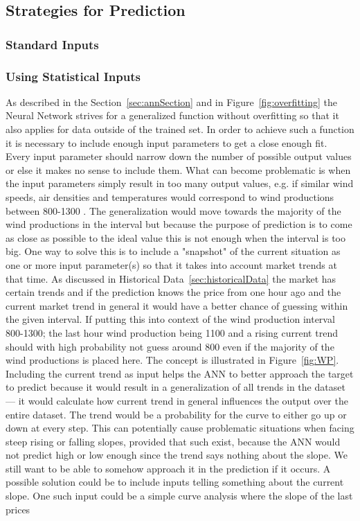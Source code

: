 \subsection{Strategies for Prediction}
\subsubsection{Standard Inputs}

\subsubsection{Using Statistical Inputs}
\label{sec:usingStatisticalInput}
As described in the Section~\ref{sec:annSection} and in Figure~\ref{fig:overfitting} the Neural Network strives for a generalized function without overfitting so that it also applies for data outside of the trained set. In order to achieve such a function it is necessary to include enough input parameters to get a close enough fit. Every input parameter should narrow down the number of possible output values or else it makes no sense to include them. What can become problematic is when the input parameters simply result in too many output values, e.g. if similar wind speeds, air densities and temperatures would correspond to wind productions between 800-1300 . The generalization would move towards the majority of the wind productions in the interval but because the purpose of prediction is to come as close as possible to the ideal value this is not enough when the interval is too big. One way to solve this is to include a "snapshot" of the current situation as one or more input parameter(s) so that it takes into account market trends at that time. As discussed in Historical Data~\ref{sec:historicalData} the market has certain trends and if the prediction knows the price from one hour ago and the current market trend in general it would have a better chance of guessing within the given interval. If putting this into context of the wind production interval 800-1300; the last hour wind production being 1100 and a rising current trend should with high probability not guess around 800 even if the majority of the wind productions is placed here. The concept is illustrated in Figure~\ref{fig:WP}. Including the current trend as input helps the ANN to better approach the target to predict because it would result in a generalization of all trends in the dataset --- it would calculate how current trend in general influences the output over the entire dataset. The trend would be a probability for the curve to either go up or down at every step. This can potentially cause problematic situations when facing steep rising or falling slopes, provided that such exist, because the ANN would not predict high or low enough since the trend says nothing about the slope. We still want to be able to somehow approach it in the prediction if it occurs. A possible solution could be to include inputs telling something about the current slope. One such input could be a simple curve analysis where the slope of the last prices 